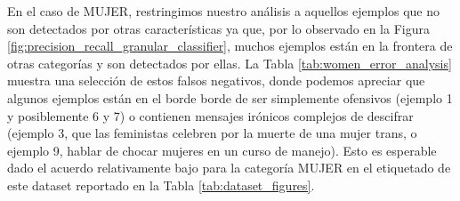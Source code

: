En el caso de MUJER, restringimos nuestro análisis a aquellos ejemplos que no son detectados por otras características ya que, por lo observado en la Figura \ref{fig:precision_recall_granular_classifier}, muchos ejemplos están en la frontera de otras categorías y son detectados por ellas. La Tabla \ref{tab:women_error_analysis} muestra una selección de estos falsos negativos, donde podemos apreciar que algunos ejemplos están en el borde borde de ser simplemente ofensivos (ejemplo 1 y posiblemente 6 y 7) o contienen mensajes irónicos complejos de descifrar (ejemplo 3, que las feministas celebren por la muerte de una mujer trans, o ejemplo 9, hablar de chocar mujeres en un curso de manejo). Esto es esperable dado el acuerdo relativamente bajo para la categoría MUJER en el etiquetado de este dataset reportado en la Tabla \ref{tab:dataset_figures}.




